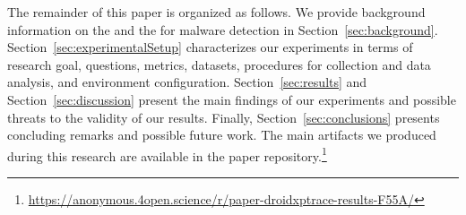 
The remainder of this paper is organized as follows. 
We provide background information on the \mas and the \mas for malware detection in
Section~\ref{sec:background}. Section~\ref{sec:experimentalSetup}
characterizes our experiments in terms of research goal, questions, metrics, datasets, procedures for collection and data analysis, and environment configuration. Section~\ref{sec:results} and Section~\ref{sec:discussion} present the main findings of our experiments and possible threats to the validity of our results. Finally,
Section~\ref{sec:conclusions} presents concluding remarks and possible future
work. The main artifacts we produced during this research are available in the
paper repository.\footnote{\url{https://anonymous.4open.science/r/paper-droidxptrace-results-F55A/}}
